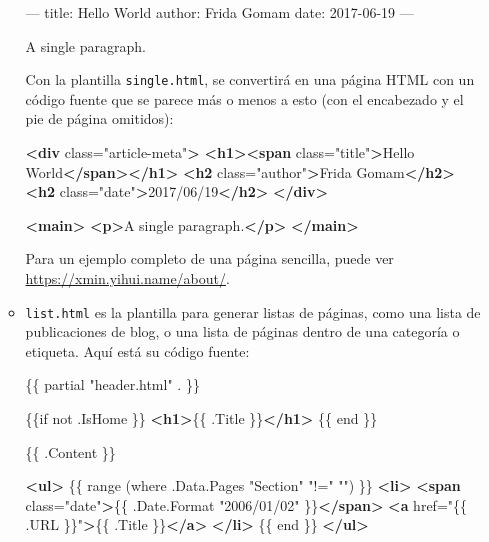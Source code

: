 \documentclass[12pt,]{krantz}
\makeatletter
\newenvironment{Shaded}{\begin{snugshade}}{\end{snugshade}}
\newcommand{\KeywordTok}[1]{\textcolor[rgb]{0.13,0.29,0.53}{\textbf{#1}}}
\newcommand{\NormalTok}[1]{#1}
\newcommand{\OtherTok}[1]{\textcolor[rgb]{0.56,0.35,0.01}{#1}}
\newcommand{\StringTok}[1]{\textcolor[rgb]{0.31,0.60,0.02}{#1}}
\newenvironment{kframe}{%
\medskip{}
\setlength{\fboxsep}{.8em}
 \def\at@end@of@kframe{}%
 \ifinner\ifhmode%
  \def\at@end@of@kframe{\end{minipage}}%
  \begin{minipage}{\columnwidth}%
 \fi\fi%
 \def\FrameCommand##1{\hskip\@totalleftmargin \hskip-\fboxsep
 \colorbox{shadecolor}{##1}\hskip-\fboxsep
     \hskip-\linewidth \hskip-\@totalleftmargin \hskip\columnwidth}%
 \MakeFramed {\advance\hsize-\width
   \@totalleftmargin\z@ \linewidth\hsize
   \@setminipage}}%
 {\par\unskip\endMakeFramed%
 \at@end@of@kframe}
\renewenvironment{Shaded}{\begin{kframe}}{\end{kframe}}
\theoremstyle{definition}
\theoremstyle{definition}
\theoremstyle{definition}
\theoremstyle{remark}
\makeatother
\begin{document}
\begin{itemize}
\begin{itemize}
\begin{Shaded}
\begin{Highlighting}[]
\NormalTok{---}
\NormalTok{title: Hello World}
\NormalTok{author: Frida Gomam}
\NormalTok{date: 2017-06-19}
\NormalTok{---}

\NormalTok{A single paragraph.}
\end{Highlighting}
\end{Shaded}

    Con la plantilla \texttt{single.html}, se convertirá en una página
    HTML con un código fuente que se parece más o menos a esto (con el
    encabezado y el pie de página omitidos):

\begin{Shaded}
\begin{Highlighting}[]
\KeywordTok{<div}\OtherTok{ class=}\StringTok{"article-meta"}\KeywordTok{>}
  \KeywordTok{<h1><span}\OtherTok{ class=}\StringTok{"title"}\KeywordTok{>}\NormalTok{Hello World}\KeywordTok{</span></h1>}
  \KeywordTok{<h2}\OtherTok{ class=}\StringTok{"author"}\KeywordTok{>}\NormalTok{Frida Gomam}\KeywordTok{</h2>}
  \KeywordTok{<h2}\OtherTok{ class=}\StringTok{"date"}\KeywordTok{>}\NormalTok{2017/06/19}\KeywordTok{</h2>}
\KeywordTok{</div>}

\KeywordTok{<main>}
  \KeywordTok{<p>}\NormalTok{A single paragraph.}\KeywordTok{</p>}
\KeywordTok{</main>}
\end{Highlighting}
\end{Shaded}

    Para un ejemplo completo de una página sencilla, puede ver
    \url{https://xmin.yihui.name/about/}.
  \item
    \texttt{list.html} es la plantilla para generar
    listas de páginas, como una lista de publicaciones de blog, o una
    lista de páginas dentro de una categoría o etiqueta. Aquí está su
    código fuente:

\begin{Shaded}
\begin{Highlighting}[]
\NormalTok{\{\{ partial "header.html" . \}\}}

\NormalTok{\{\{if not .IsHome \}\}}
\KeywordTok{<h1>}\NormalTok{\{\{ .Title \}\}}\KeywordTok{</h1>}
\NormalTok{\{\{ end \}\}}

\NormalTok{\{\{ .Content \}\}}

\KeywordTok{<ul>}
\NormalTok{  \{\{ range (where .Data.Pages "Section" "!=" "") \}\}}
  \KeywordTok{<li>}
    \KeywordTok{<span}\OtherTok{ class=}\StringTok{"date"}\KeywordTok{>}\NormalTok{\{\{ .Date.Format "2006/01/02" \}\}}\KeywordTok{</span>}
    \KeywordTok{<a}\OtherTok{ href=}\StringTok{"\{\{ .URL \}\}"}\KeywordTok{>}\NormalTok{\{\{ .Title \}\}}\KeywordTok{</a>}
  \KeywordTok{</li>}
\NormalTok{  \{\{ end \}\}}
\KeywordTok{</ul>}


\end{Highlighting}
\end{Shaded}
\end{itemize}
\end{itemize}
\end{document}
